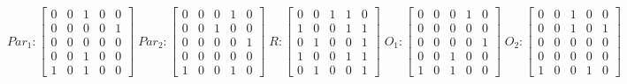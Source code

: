      $$
        Par_{1} : \begin{bmatrix}
            0 & 0 & 1 & 0 & 0 \\
            0 & 0 & 0 & 0 & 1 \\
            0 & 0 & 0 & 0 & 0 \\
			0 & 0 & 1 & 0 & 0 \\
            1 & 0 & 1 & 0 & 0 
        \end{bmatrix}
        \;
        Par_{2} : \begin{bmatrix}
            0 & 0 & 0 & 1 & 0 \\
            0 & 0 & 1 & 0 & 0 \\
            0 & 0 & 0 & 0 & 1 \\
            0 & 0 & 0 & 0 & 0 \\
            1 & 0 & 0 & 1 & 0
        \end{bmatrix}
        \;
        R : \begin{bmatrix}
            0 & 0 & 1 & 1 & 0 \\
            1 & 0 & 0 & 1 & 1 \\
            0 & 1 & 0 & 0 & 1 \\
            1 & 0 & 0 & 1 & 1 \\
            0 & 1 & 0 & 0 & 1
        \end{bmatrix}
        \;
        O_{1} : \begin{bmatrix}
            0 & 0 & 0 & 1 & 0 \\
            0 & 0 & 0 & 0 & 0 \\
            0 & 0 & 0 & 0 & 1 \\
            0 & 0 & 1 & 0 & 0 \\
            1 & 0 & 1 & 0 & 0
        \end{bmatrix}
        \;
        O_{2} : \begin{bmatrix}
            0 & 0 & 1 & 0 & 0 \\
            0 & 0 & 1 & 0 & 1 \\
            0 & 0 & 0 & 0 & 0 \\
            0 & 0 & 0 & 0 & 0 \\
            1 & 0 & 0 & 1 & 0
        \end{bmatrix}
    $$ 
